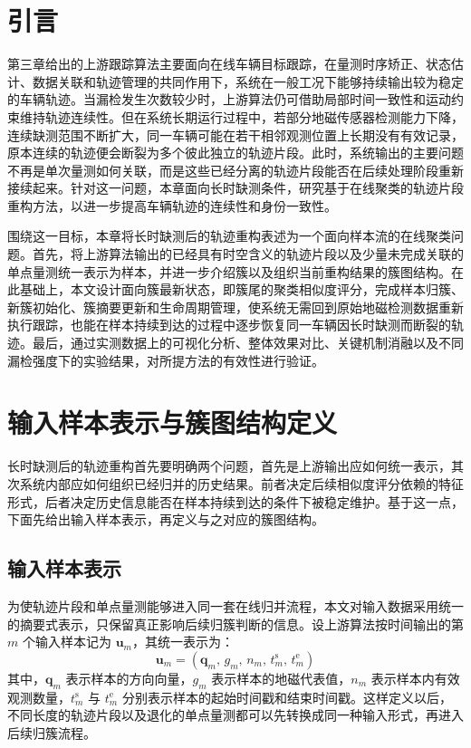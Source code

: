 \documentclass{xdupgthesis}
\begin{document}
\graphicspath{
	{code/chapter4/experiment123/chapter4_results/exp1/}
	{code/chapter4/experiment123/chapter4_results/exp2/}
	{code/chapter4/experiment123/chapter4_results/exp3/}
}

\section{引言}

第三章给出的上游跟踪算法主要面向在线车辆目标跟踪，在量测时序矫正、状态估计、数据关联和轨迹管理的共同作用下，系统在一般工况下能够持续输出较为稳定的车辆轨迹。当漏检发生次数较少时，上游算法仍可借助局部时间一致性和运动约束维持轨迹连续性。但在系统长期运行过程中，若部分地磁传感器检测能力下降，连续缺测范围不断扩大，同一车辆可能在若干相邻观测位置上长期没有有效记录，原本连续的轨迹便会断裂为多个彼此独立的轨迹片段。此时，系统输出的主要问题不再是单次量测如何关联，而是这些已经分离的轨迹片段能否在后续处理阶段重新接续起来。针对这一问题，本章面向长时缺测条件，研究基于在线聚类的轨迹片段重构方法，以进一步提高车辆轨迹的连续性和身份一致性。

围绕这一目标，本章将长时缺测后的轨迹重构表述为一个面向样本流的在线聚类问题。首先，将上游算法输出的已经具有时空含义的轨迹片段以及少量未完成关联的单点量测统一表示为样本，并进一步介绍簇以及组织当前重构结果的簇图结构。在此基础上，本文设计面向簇最新状态，即簇尾的聚类相似度评分，完成样本归簇、新簇初始化、簇摘要更新和生命周期管理，使系统无需回到原始地磁检测数据重新执行跟踪，也能在样本持续到达的过程中逐步恢复同一车辆因长时缺测而断裂的轨迹。最后，通过实测数据上的可视化分析、整体效果对比、关键机制消融以及不同漏检强度下的实验结果，对所提方法的有效性进行验证。

\section{输入样本表示与簇图结构定义}

长时缺测后的轨迹重构首先要明确两个问题，首先是上游输出应如何统一表示，其次系统内部应如何组织已经归并的历史结果。前者决定后续相似度评分依赖的特征形式，后者决定历史信息能否在样本持续到达的条件下被稳定维护。基于这一点，下面先给出输入样本表示，再定义与之对应的簇图结构。

\subsection{输入样本表示}

为使轨迹片段和单点量测能够进入同一套在线归并流程，本文对输入数据采用统一的摘要式表示，只保留真正影响后续归簇判断的信息。设上游算法按时间输出的第 $m$ 个输入样本记为 $\mathbf{u}_m$，其统一表示为：
\begin{equation}
	\mathbf{u}_m=
	\left(
	\mathbf{q}_m,\,
	g_m,\,
	n_m,\,
	t_m^{\mathrm{s}},\,
	t_m^{\mathrm{e}}
	\right)
\end{equation}
其中，$\mathbf{q}_m$ 表示样本的方向向量，$g_m$ 表示样本的地磁代表值，$n_m$ 表示样本内有效观测数量，$t_m^{\mathrm{s}}$ 与 $t_m^{\mathrm{e}}$ 分别表示样本的起始时间戳和结束时间戳。这样定义以后，不同长度的轨迹片段以及退化的单点量测都可以先转换成同一种输入形式，再进入后续归簇流程。
\end{document}
